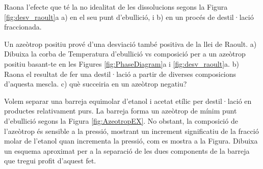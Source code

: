 \begin{exr}
Raona l'efecte que té la no idealitat de les dissolucions segons la Figura \ref{fig:desv_raoult}a a) en el seu punt d'ebullició, i b) en un procés de destil·lació fraccionada.
\end{exr}

\begin{exr}
    Un azeòtrop positiu prové d'una desviació també positiva de la llei de Raoult. a) Dibuixa la corba de Temperatura d'ebullició vs composició per a un azeòtrop positiu basant-te en les Figures \ref{fig:PhaseDiagram}a i \ref{fig:desv_raoult}a. b) Raona el resultat de fer una destil·lació a partir de diverses composicions d'aquesta mescla. c) què succeiria en un azeòtrop negatiu?
    \end{exr}
    \begin{exr}
        Volem separar una barreja equimolar d'etanol i acetat etílic per destil·lació en productes relativament purs. La barreja forma un azeòtrop de mínim punt d'ebullició segons la Figura \ref{fig:AzeotropEX}. No obstant, la composició de l'azeòtrop és sensible a la pressió, mostrant un increment significatiu de la fracció molar de l'etanol quan incrementa la pressió, com es mostra a la Figura. Dibuixa un esquema aproximat per a la separació de les dues components de la barreja que tregui profit d'aquest fet.
        \end{exr}